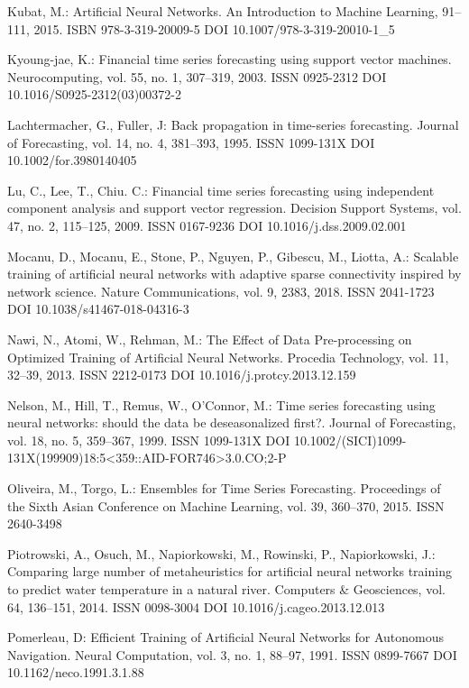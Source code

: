 \begin{thebibliography}{99.}
 Kubat, M.: Artificial Neural Networks. An Introduction to Machine Learning, 91--111, 2015. ISBN 978-3-319-20009-5 DOI 10.1007/978-3-319-20010-1\_5

 Kyoung-jae, K.: Financial time series forecasting using support vector machines. Neurocomputing, vol. 55, no. 1, 307--319, 2003. ISSN 0925-2312 DOI 10.1016/S0925-2312(03)00372-2

 Lachtermacher, G., Fuller, J: Back propagation in time-series forecasting. Journal of Forecasting, vol. 14, no. 4, 381--393, 1995. ISSN 1099-131X DOI 10.1002/for.3980140405

 Lu, C., Lee, T., Chiu. C.: Financial time series forecasting using independent component analysis and support vector regression. Decision Support Systems, vol. 47, no. 2, 115--125, 2009. ISSN 0167-9236 DOI 10.1016/j.dss.2009.02.001

 Mocanu, D., Mocanu, E., Stone, P., Nguyen, P., Gibescu, M., Liotta, A.: Scalable training of artificial neural networks with adaptive sparse connectivity inspired by network science. Nature Communications, vol. 9, 2383, 2018. ISSN 2041-1723 DOI 10.1038/s41467-018-04316-3

 Nawi, N., Atomi, W., Rehman, M.: The Effect of Data Pre-processing on Optimized Training of Artificial Neural Networks. Procedia Technology, vol. 11, 32--39, 2013. ISSN 2212-0173 DOI 10.1016/j.protcy.2013.12.159

 Nelson, M., Hill, T., Remus, W., O'Connor, M.: Time series forecasting using neural networks: should the data be deseasonalized first?. Journal of Forecasting, vol. 18, no. 5, 359--367, 1999. ISSN 1099-131X DOI 10.1002/(SICI)1099-131X(199909)18:5<359::AID-FOR746>3.0.CO;2-P

 Oliveira, M., Torgo, L.: Ensembles for Time Series Forecasting. Proceedings of the Sixth Asian Conference on Machine Learning, vol. 39, 360--370, 2015. ISSN 2640-3498

 Piotrowski, A., Osuch, M., Napiorkowski, M., Rowinski, P., Napiorkowski, J.: Comparing large number of metaheuristics for artificial neural networks training to predict water temperature in a natural river. Computers \& Geosciences, vol. 64, 136--151, 2014. ISSN 0098-3004 DOI 10.1016/j.cageo.2013.12.013

 Pomerleau, D: Efficient Training of Artificial Neural Networks for Autonomous Navigation. Neural Computation, vol. 3, no. 1, 88--97, 1991. ISSN 0899-7667 DOI 10.1162/neco.1991.3.1.88


\end{thebibliography}

